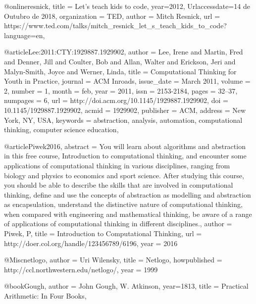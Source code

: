 @online{resnick,
	title = {Let's teach kids to code},
	year={2012},
	Urlaccessdate={14 de Outubro de 2018},
	organization = {TED},
	author = {Mitch Resnick},
	url = {https://www.ted.com/talks/mitch_resnick_let_s_teach_kids_to_code?language=en},
}

@article{Lee:2011:CTY:1929887.1929902,
 author = {Lee, Irene and Martin, Fred and Denner, Jill and Coulter, Bob and Allan, Walter and Erickson, Jeri and Malyn-Smith, Joyce and Werner, Linda},
 title = {Computational Thinking for Youth in Practice},
 journal = {ACM Inroads},
 issue_date = {March 2011},
 volume = {2},
 number = {1},
 month = feb,
 year = {2011},
 issn = {2153-2184},
 pages = {32--37},
 numpages = {6},
 url = {http://doi.acm.org/10.1145/1929887.1929902},
 doi = {10.1145/1929887.1929902},
 acmid = {1929902},
 publisher = {ACM},
 address = {New York, NY, USA},
 keywords = {abstraction, analysis, automation, computational thinking, computer science education},
} 



@article{Piwek2016,
abstract = {You will learn about algorithms and abstraction in this free course, Introduction to computational thinking, and encounter some applications of computational thinking in various disciplines, ranging from biology and physics to economics and sport science. After studying this course, you should be able to describe the skills that are involved in computational thinking, define and use the concepts of abstraction as modelling and abstraction as encapsulation, understand the distinctive nature of computational thinking, when compared with engineering and mathematical thinking, be aware of a range of applications of computational thinking in different disciplines.},
author = {Piwek, P},
title = {Introduction to Computational Thinking},
url = {http://doer.col.org/handle/123456789/6196},
year = {2016}
}

@Misc{netlogo,
author =   {Uri Wilensky},
title =    {Netlogo},
howpublished = {http://ccl.northwestern.edu/netlogo/},
year = {1999}
}

@book{Gough,
	author = {John Gough, W. Atkinson},
	year={1813},
	title = {Practical Arithmetic: In Four Books},
}

